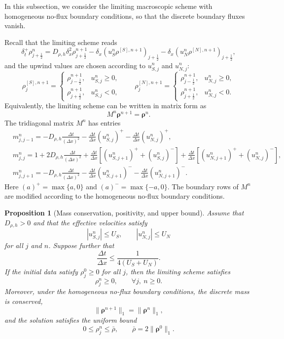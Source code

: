 \documentclass[11pt,twoside]{article}
\numberwithin{equation}{section}
\theoremstyle{plain}
\newtheorem{proposition}[theorem]{Proposition}
\theoremstyle{nonumberplain}
\newcommand{\brho}{\boldsymbol{\rho}}
\begin{document}
{In this subsection, we consider the limiting macroscopic scheme with
homogeneous no-flux boundary conditions, so that the discrete boundary
fluxes vanish.

Recall that the limiting scheme reads
\[
\delta_t^+\rho_{j+\frac12}^n
=
D_{\rho,h}\delta_x^2\rho_{j+\frac12}^{n+1}
-
\delta_x\left(u_S^n\rho^{[S],n+1}\right)_{j+\frac12}
-
\delta_x\left(u_N^n\rho^{[N],n+1}\right)_{j+\frac12},
\]
and the upwind values are chosen according to $u_{S,j}^n$ and $u_{N,j}^n$:
\[
\rho_j^{[S],n+1}
=
\begin{cases}
\rho_{j-\frac12}^{n+1}, & u_{S,j}^n\ge0,\\
\rho_{j+\frac12}^{n+1}, & u_{S,j}^n<0,
\end{cases}
\qquad
\rho_j^{[N],n+1}
=
\begin{cases}
\rho_{j-\frac12}^{n+1}, & u_{N,j}^n\ge0,\\
\rho_{j+\frac12}^{n+1}, & u_{N,j}^n<0.
\end{cases}
\]
Equivalently, the limiting scheme can be written in matrix form as
\[
M^n\brho^{n+1}=\brho^n .
\]
The tridiagonal matrix $M^n$ has entries
\begin{align*}
&m_{j,j-1}^n
=
-D_{\rho,h}\frac{\Delta t}{(\Delta x)^2}
-\frac{\Delta t}{\Delta x}(u_{S,j}^n)^+
-\frac{\Delta t}{\Delta x}(u_{N,j}^n)^+,\\
&m_{j,j}^n
=
1+2D_{\rho,h}\frac{\Delta t}{(\Delta x)^2}
+\frac{\Delta t}{\Delta x}
\left[(u_{S,j+1}^n)^+ +(u_{S,j}^n)^-\right]
+\frac{\Delta t}{\Delta x}
\left[(u_{N,j+1}^n)^+ +(u_{N,j}^n)^-\right],\\
&m_{j,j+1}^n
=
-D_{\rho,h}\frac{\Delta t}{(\Delta x)^2}
-\frac{\Delta t}{\Delta x}(u_{S,j+1}^n)^-
-\frac{\Delta t}{\Delta x}(u_{N,j+1}^n)^- .
\end{align*}
Here $(a)^+=\max\{a,0\}$ and $(a)^-=\max\{-a,0\}$.
The boundary rows of \(M^n\) are modified according to the homogeneous
no-flux boundary conditions.

\begin{proposition}[Mass conservation, positivity, and upper bound]
Assume that $D_{\rho,h}>0$ and that the effective velocities satisfy
\[
|u_{S,j}^n|\le U_S,\qquad |u_{N,j}^n|\le U_N
\]
for all $j$ and $n$. Suppose further that
\begin{equation}\label{eq:CFL-bound-new}
\frac{\Delta t}{\Delta x}
\le
\frac{1}{4(U_S+U_N)} .
\end{equation}
If the initial data satisfy $\rho_j^0\ge0$ for all $j$, then the
limiting scheme satisfies
\[
\rho_j^n\ge0,\qquad \forall j,\ n\ge0.
\]
Moreover, under the homogeneous no-flux boundary conditions, the discrete
mass is conserved,
\[
\|\brho^{n+1}\|_1=\|\brho^n\|_1,
\]
and the solution satisfies the uniform bound
\[
0\le \rho_j^n\le \bar\rho,\qquad
\bar\rho=2\|\brho^0\|_1 .
\]
\end{proposition}

}
\end{document}
